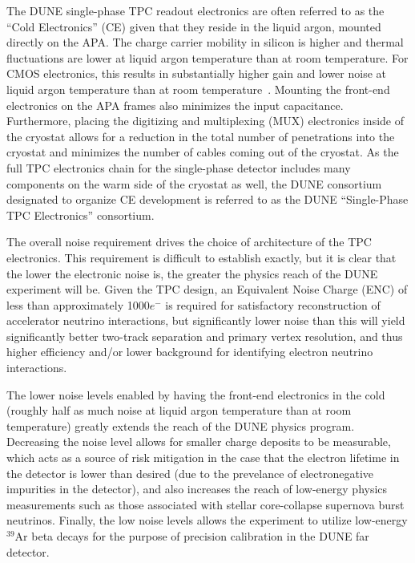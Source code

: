 The DUNE single-phase TPC readout electronics are often referred to as the ``Cold Electronics'' (CE) given that they reside in the liquid argon, mounted directly on the APA.  The charge carrier mobility in silicon is higher and thermal fluctuations are lower at liquid argon temperature than at room temperature.  For CMOS electronics, this results in substantially higher gain and lower noise at liquid argon temperature than at room temperature~\cite{LArCMOS}.  Mounting the front-end electronics on the APA frames also minimizes the input capacitance.  Furthermore, placing the digitizing and multiplexing (MUX) electronics inside of the cryostat allows for a reduction in the total number of penetrations into the cryostat and minimizes the number of cables coming out of the cryostat.  As the full TPC electronics chain for the single-phase detector includes many components on the warm side of the cryostat as well, the DUNE consortium designated to organize CE development is referred to as the DUNE ``Single-Phase TPC Electronics'' consortium.

The overall noise requirement drives the choice of architecture of the TPC electronics. This requirement is difficult to establish exactly, but it is clear that the lower the electronic noise is, the greater the physics reach of the DUNE experiment will be.  Given the TPC design, an Equivalent Noise Charge (ENC) of less than approximately 1000$e^-$ is required for satisfactory reconstruction of accelerator neutrino interactions, but significantly lower noise than this will yield significantly better two-track separation and primary vertex resolution, and thus higher efficiency and/or lower background for identifying electron neutrino interactions.

The lower noise levels enabled by having the front-end electronics in the cold (roughly half as much noise at liquid argon temperature than at room temperature) greatly extends the reach of the DUNE physics program.  Decreasing the noise level allows for smaller charge deposits to be measurable, which acts as a source of risk mitigation in the case that the electron lifetime in the detector is lower than desired (due to the prevelance of electronegative impurities in the detector), and also increases the reach of low-energy physics measurements such as those associated with stellar core-collapse supernova burst neutrinos.  Finally, the low noise levels allows the experiment to utilize low-energy $\mathrm{{}^{39}Ar}$ beta decays for the purpose of precision calibration in the DUNE far detector.

